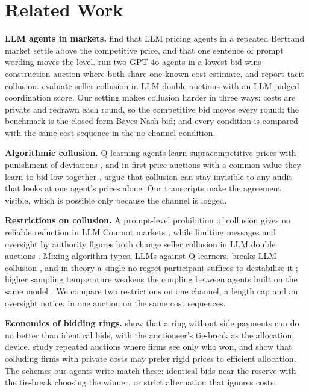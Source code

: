 \documentclass[10pt]{article}
\newcommand{\para}[1]{\textbf{#1}\hspace{0.4em}}
\begin{document}
\appendix
\section{Related Work}
\label{app:related}

\para{LLM agents in markets.} \citet{fish2024} find that LLM pricing agents in a repeated Bertrand market settle above the competitive price, and that one sentence of prompt wording moves the level. \citet{heo2026} run two GPT-4o agents in a lowest-bid-wins construction auction where both share one known cost estimate, and report tacit collusion. \citet{agrawal2025} evaluate seller collusion in LLM double auctions with an LLM-judged coordination score. Our setting makes collusion harder in three ways: costs are private and redrawn each round, so the competitive bid moves every round; the benchmark is the closed-form Bayes-Nash bid; and every condition is compared with the same cost sequence in the no-channel condition.

\para{Algorithmic collusion.} Q-learning agents learn supracompetitive prices with punishment of deviations \citep{calvano2020}, and in first-price auctions with a common value they learn to bid low together \citep{banchio2022}. \citet{xu2026} argue that collusion can stay invisible to any audit that looks at one agent's prices alone. Our transcripts make the agreement visible, which is possible only because the channel is logged.

\para{Restrictions on collusion.} A prompt-level prohibition of collusion gives no reliable reduction in LLM Cournot markets \citep{bracale2026}, while limiting messages and oversight by authority figures both change seller collusion in LLM double auctions \citep{agrawal2025}. Mixing algorithm types, LLMs against Q-learners, breaks LLM collusion \citep{keppo2026}, and in theory a single no-regret participant suffices to destabilise it \citep{collina2025}; higher sampling temperature weakens the coupling between agents built on the same model \citep{xu2026}. We compare two restrictions on one channel, a length cap and an oversight notice, in one auction on the same cost sequences.

\para{Economics of bidding rings.} \citet{mcafee1992} show that a ring without side payments can do no better than identical bids, with the auctioneer's tie-break as the allocation device. \citet{skrzypacz2004} study repeated auctions where firms see only who won, and \citet{athey2004} show that colluding firms with private costs may prefer rigid prices to efficient allocation. The schemes our agents write match these: identical bids near the reserve with the tie-break choosing the winner, or strict alternation that ignores costs.
\end{document}
